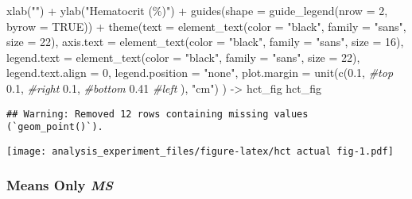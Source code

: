 \documentclass[
]{article}
\newenvironment{Shaded}{\begin{snugshade}}{\end{snugshade}}
\newcommand{\AttributeTok}[1]{\textcolor[rgb]{0.77,0.63,0.00}{#1}}
\newcommand{\CommentTok}[1]{\textcolor[rgb]{0.56,0.35,0.01}{\textit{#1}}}
\newcommand{\ConstantTok}[1]{\textcolor[rgb]{0.00,0.00,0.00}{#1}}
\newcommand{\DecValTok}[1]{\textcolor[rgb]{0.00,0.00,0.81}{#1}}
\newcommand{\FloatTok}[1]{\textcolor[rgb]{0.00,0.00,0.81}{#1}}
\newcommand{\FunctionTok}[1]{\textcolor[rgb]{0.00,0.00,0.00}{#1}}
\newcommand{\NormalTok}[1]{#1}
\newcommand{\OtherTok}[1]{\textcolor[rgb]{0.56,0.35,0.01}{#1}}
\newcommand{\SpecialCharTok}[1]{\textcolor[rgb]{0.00,0.00,0.00}{#1}}
\newcommand{\StringTok}[1]{\textcolor[rgb]{0.31,0.60,0.02}{#1}}
\begin{document}
\begin{Shaded}
\begin{Highlighting}[]
  \FunctionTok{xlab}\NormalTok{(}\StringTok{""}\NormalTok{) }\SpecialCharTok{+} 
  \FunctionTok{ylab}\NormalTok{(}\StringTok{"Hematocrit (\%)"}\NormalTok{) }\SpecialCharTok{+} 
  \FunctionTok{guides}\NormalTok{(}\AttributeTok{shape =} \FunctionTok{guide\_legend}\NormalTok{(}\AttributeTok{nrow =} \DecValTok{2}\NormalTok{, }\AttributeTok{byrow =} \ConstantTok{TRUE}\NormalTok{)) }\SpecialCharTok{+}
  \FunctionTok{theme}\NormalTok{(}\AttributeTok{text =} \FunctionTok{element\_text}\NormalTok{(}\AttributeTok{color =} \StringTok{"black"}\NormalTok{, }
                            \AttributeTok{family =} \StringTok{"sans"}\NormalTok{, }
                            \AttributeTok{size =} \DecValTok{22}\NormalTok{),}
        \AttributeTok{axis.text =} \FunctionTok{element\_text}\NormalTok{(}\AttributeTok{color =} \StringTok{"black"}\NormalTok{, }
                                 \AttributeTok{family =} \StringTok{"sans"}\NormalTok{, }
                                 \AttributeTok{size =} \DecValTok{16}\NormalTok{),}
        \AttributeTok{legend.text =} \FunctionTok{element\_text}\NormalTok{(}\AttributeTok{color =} \StringTok{"black"}\NormalTok{, }
                                 \AttributeTok{family =} \StringTok{"sans"}\NormalTok{, }
                                 \AttributeTok{size =} \DecValTok{22}\NormalTok{),}
        \AttributeTok{legend.text.align =} \DecValTok{0}\NormalTok{,}
        \AttributeTok{legend.position =} \StringTok{"none"}\NormalTok{,}
        \AttributeTok{plot.margin =} \FunctionTok{unit}\NormalTok{(}\FunctionTok{c}\NormalTok{(}\FloatTok{0.1}\NormalTok{, }\CommentTok{\#top}
                             \FloatTok{0.1}\NormalTok{, }\CommentTok{\#right}
                             \FloatTok{0.1}\NormalTok{, }\CommentTok{\#bottom}
                             \FloatTok{0.41} \CommentTok{\#left}
\NormalTok{                             ), }\StringTok{"cm"}\NormalTok{)}
\NormalTok{        ) }\OtherTok{{-}\textgreater{}}\NormalTok{ hct\_fig}
\NormalTok{hct\_fig}
\end{Highlighting}
\end{Shaded}

\begin{verbatim}
## Warning: Removed 12 rows containing missing values (`geom_point()`).
\end{verbatim}

\texttt{[image: analysis\_experiment\_files/figure-latex/hct actual fig-1.pdf]}

\hypertarget{means-only-ms-1}{%
\subsubsection{\texorpdfstring{Means Only
\emph{MS}}{Means Only MS}}\label{means-only-ms-1}}
\end{document}
